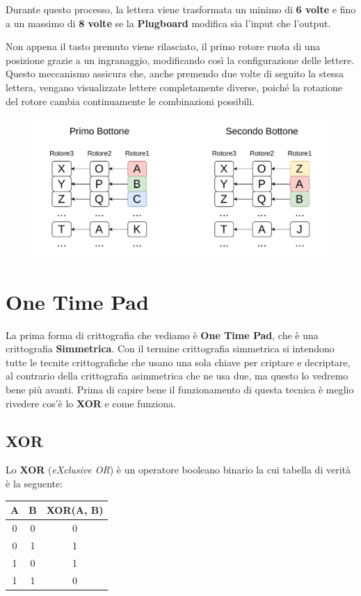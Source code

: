 \documentclass{rapport}
\begin{document}
Durante questo processo, la lettera viene trasformata un minimo di \textbf{6 volte} e fino a un massimo di \textbf{8 volte} se la \textbf{Plugboard} modifica sia l'input che l'output.

Non appena il tasto premuto viene rilasciato, il primo rotore ruota di una posizione grazie a un ingranaggio, modificando così la configurazione delle lettere. Questo meccanismo assicura che, anche premendo due volte di seguito la stessa lettera, vengano visualizzate lettere completamente diverse, poiché la rotazione del rotore cambia continuamente le combinazioni possibili. 

\begin{figure}[h]
    \centering
    \includegraphics[width=\linewidth]{logos/enigma8.pdf}
\end{figure}


\section{One Time Pad}
La prima forma di crittografia che vediamo è \textbf{One Time Pad}, che è una crittografia \textbf{Simmetrica}. Con il termine crittografia simmetrica si intendono tutte le tecnite crittografiche che usano una sola chiave per criptare e decriptare, al contrario della crittografia asimmetrica che ne usa due, ma questo lo vedremo bene più avanti. Prima di capire bene il funzionamento di questa tecnica è meglio rivedere cos'è lo \textbf{XOR} e come funziona.


\subsection{XOR}
Lo \textbf{XOR} (\textit{eXclusive OR}) è un operatore booleano binario la cui tabella di verità è la seguente:

\begin{center}
\begin{table}[h]
\centering
\begin{tabular}{c|c|c}
A & B & XOR(A, B) \\
\hline
0 & 0 & 0         \\
0 & 1 & 1         \\
1 & 0 & 1         \\
1 & 1 & 0         \\
\end{tabular}
\end{table}
\end{center}
\end{document}
